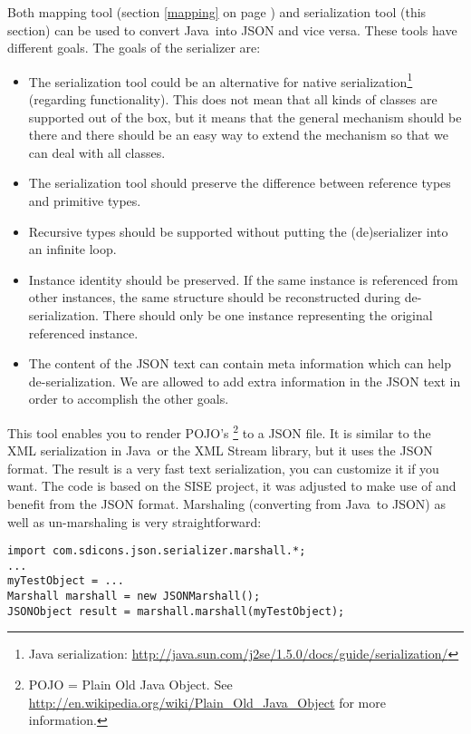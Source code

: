 \documentclass[a4paper]{article}
\newcommand{\java}{Java}
\begin{document}
Both mapping tool (section \ref{mapping} on page \pageref{mapping})  and serialization tool (this section) can be used to convert \java\ into JSON and vice versa. These tools have different goals. The goals of the serializer are:

\begin{itemize}
	\item The serialization tool could be an alternative for native serialization\footnote{Java serialization: \url{http://java.sun.com/j2se/1.5.0/docs/guide/serialization/}} (regarding functionality). This does not mean that all kinds of classes are supported out of the box, but it means that the general mechanism should be there and there should be an easy way to extend the mechanism so that we can deal with all classes.
	\item The serialization tool should preserve the difference between reference types and primitive types.
	\item Recursive types should be supported without putting the (de)serializer into an infinite loop.
	\item Instance identity should be preserved. If the same instance is referenced from other instances, the same structure should be reconstructed during de-serialization. There should only be one instance representing the original referenced instance.
	\item The content of the JSON text can contain meta information which can help de-serialization. We are allowed to add extra information in the JSON text in order to accomplish the other goals.
\end{itemize}

This tool enables you to render POJO's \footnote{POJO = Plain Old Java Object. See \url{http://en.wikipedia.org/wiki/Plain_Old_Java_Object} for more information.}  to a JSON file. It is similar to the XML serialization in \java\ or the XML Stream library, but it uses the JSON format. The result is a very fast text serialization, you can customize it if you want.  The code is based on the SISE project, it was adjusted to make use of and benefit from the JSON format. Marshaling (converting from \java\ to JSON) as well as un-marshaling is very straightforward:

\medskip
\begin{lstlisting}
import com.sdicons.json.serializer.marshall.*;
...
myTestObject = ...
Marshall marshall = new JSONMarshall();
JSONObject result = marshall.marshall(myTestObject);
\end{lstlisting}
\medskip
\end{document}

